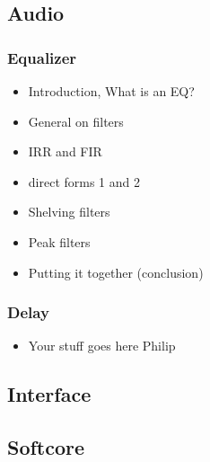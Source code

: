 \documentclass[12p]{article}
\begin{document}
\subsection{Audio}
\label{Theory:Audio}

\subsubsection{Equalizer}
\begin{itemize}
\item Introduction, What is an EQ?
\item General on filters
\item IRR and FIR
\item direct forms 1 and 2
\item Shelving filters
\item Peak filters
\item Putting it together (conclusion)
\end{itemize}

\subsubsection{Delay}
\begin{itemize}
\item Your stuff goes here Philip
\end{itemize}

\subsection{Interface}
\label{Theory:Interface}

\subsection{Softcore}
\label{Theory:Softcore}

\end{document}
